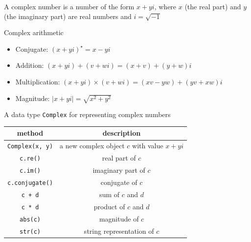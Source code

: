 \documentclass[8pt,a4paper,compress]{beamer}
\begin{document}
\begin{frame}[fragile]
\pause

A complex number is a number of the form $x+yi$, where $x$ (the real part) and $y$ (the imaginary part) are real numbers and $i=\sqrt{-1}$

\pause
\bigskip

Complex arithmetic
\begin{itemize}
\item Conjugate: $(x+yi)^\star=x-yi$

\item Addition: $(x+yi)+(v+wi) = (x+v) + (y+w)i$

\item Multiplication: $(x+yi)\times(v+wi) = (xv-yw) + (yv+xw)i$

\item Magnitude: $|x+yi|=\sqrt{x^2+y^2}$
\end{itemize}

\pause
\bigskip

A data type \lstinline{Complex} for representing complex numbers
\begin{center}
\begin{tabular}{cc}
method & description \\ \hline
\lstinline$Complex(x, y)$ & a new complex object $c$ with value $x + yi$ \\
\lstinline$c.re()$ & real part of $c$ \\
\lstinline$c.im()$ & imaginary part of $c$ \\
\lstinline$c.conjugate()$ & conjugate of $c$ \\
\lstinline$c + d$ & sum of $c$ and $d$ \\
\lstinline$c * d$ & product of $c$ and $d$ \\
\lstinline$abs(c)$ & magnitude of $c$ \\
\lstinline$str(c)$ & string representation of $c$
\end{tabular} 
\end{center}
\end{frame}
\end{document}
